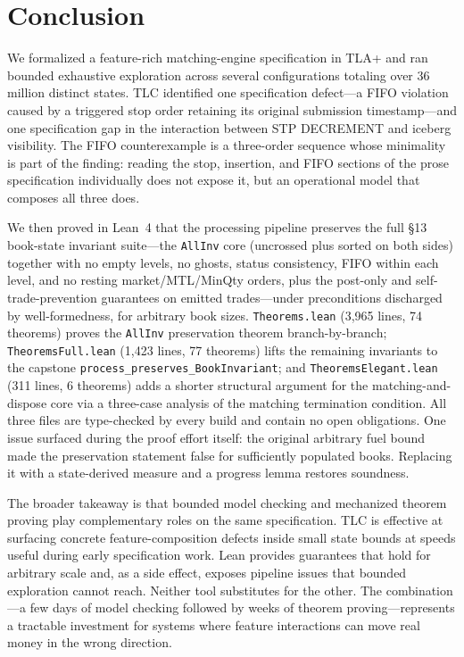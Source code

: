\documentclass[11pt,a4paper]{article}
\begin{document}
\section{Conclusion}
\label{sec:conclusion}

We formalized a feature-rich matching-engine specification in TLA+ and
ran bounded exhaustive exploration across several configurations totaling
over 36 million distinct states. TLC identified one specification
defect---a FIFO violation caused by a triggered stop order retaining its
original submission timestamp---and one specification gap in the
interaction between STP DECREMENT and iceberg visibility. The FIFO
counterexample is a three-order sequence whose minimality is part of the
finding: reading the stop, insertion, and FIFO sections of the prose
specification individually does not expose it, but an operational model
that composes all three does.

We then proved in Lean~4 that the processing pipeline preserves the full
\S13 book-state invariant suite---the \texttt{AllInv} core (uncrossed
plus sorted on both sides) together with no empty levels, no ghosts,
status consistency, FIFO within each level, and no resting
market/MTL/MinQty orders, plus the post-only and self-trade-prevention
guarantees on emitted trades---under preconditions discharged by
well-formedness, for arbitrary book sizes. \texttt{Theorems.lean}
(3{,}965 lines, 74 theorems) proves the \texttt{AllInv} preservation
theorem branch-by-branch; \texttt{TheoremsFull.lean} (1{,}423 lines,
77 theorems) lifts the remaining invariants to the capstone
\texttt{process\_preserves\_BookInvariant}; and
\texttt{TheoremsElegant.lean} (311 lines, 6 theorems) adds a shorter
structural argument for the matching-and-dispose core via a three-case
analysis of the matching termination condition. All three files are
type-checked by every build and contain no open obligations. One issue
surfaced during the proof effort itself: the original arbitrary fuel
bound made the preservation statement false for sufficiently populated
books. Replacing it with a state-derived measure and a progress lemma
restores soundness.

The broader takeaway is that bounded model checking and mechanized
theorem proving play complementary roles on the same specification. TLC
is effective at surfacing concrete feature-composition defects inside
small state bounds at speeds useful during early specification work.
Lean provides guarantees that hold for arbitrary scale and, as a side
effect, exposes pipeline issues that bounded exploration cannot reach.
Neither tool substitutes for the other. The combination---a few days of
model checking followed by weeks of theorem proving---represents a
tractable investment for systems where feature interactions can move
real money in the wrong direction.
\end{document}
